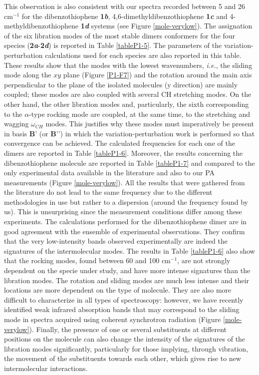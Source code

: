 		
		This observation is also consistent with our spectra recorded between 5 and 26 cm$^{-1}$ for the dibenzothiophene \textbf{1\textit{b}},  4,6-dimethyldibenzothiophene \textbf{1\textit{c}} and 4-methyldibenzothiophene \textbf{1\textit{d}} systems (see Figure \ref{mole-verylow}). The assignation of the six libration modes of the most stable dimers conformers for the four species (\textbf{2\textit{a}}-\textbf{2\textit{d}}) is reported in Table \ref{tableP1-5}. The parameters of the variation-perturbation calculations used for each species are also reported in this table. These results show that the modes with the lowest wavenumbers, \textit{i.e.}, the sliding mode along the $xy$ plane (Figure \ref{P1-F7}) and the rotation around the main axis perpendicular to the plane of the isolated molecules (y direction) are mainly coupled; these modes are also coupled with several CH stretching modes. On the other hand, the other libration modes and, particularly, the sixth corresponding to the $\alpha$-type rocking mode are coupled, at the same time, to the stretching and wagging $\omega_{CH}$ modes. This justifies why these modes must imperatively be present in basis $\textbf{B’}$ (or $\textbf{B’’}$) in which the variation-perturbation work is performed so that convergence can be achieved. The calculated frequencies for each one of the dimers are reported in Table \ref{tableP1-6}. Moreover, the results concerning the dibenzothiophene molecule are reported in Table \ref{tableP1-7} and compared to the only experimental data available in the literature and also to our PA measurements (Figure \ref{mole-verylow}). All the results that were gathered from the literature do not lead to the same frequency due to the different methodologies in use but rather to a dispersion (around the frequency found by us). This is unsurprising since the measurement conditions differ among these experiments. The calculations performed for the dibenzothiophene dimer are in good agreement with the ensemble of experimental observations. They confirm that the very low-intensity bands observed experimentally are indeed the signatures of the intermolecular modes. The results in Table \ref{tableP1-6} also show that the rocking modes, found between 60 and 100 cm$^{-1}$, are not strongly dependent on the specie under study, and have more intense signatures than the libration modes. The rotation and sliding modes are much less intense and their locations are more dependent on the type of molecule. They are also more difficult to characterize in all types of spectroscopy: however, we have recently identified weak infrared absorption bands that may correspond to the sliding mode in spectra acquired using coherent synchrotron radiation (Figure \ref{mole-verylow}). Finally, the presence of one or several substituents at different positions on the molecule can also change the intensity of the signatures of the libration modes significantly, particularly for those implying, through vibration, the movement of the substituents towards each other, which gives rise to new intermolecular interactions.\\
		
